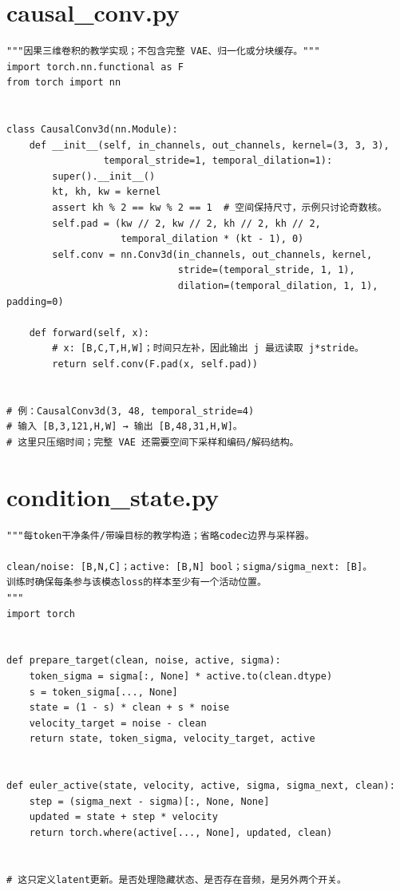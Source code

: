 \section{causal\_conv.py}
\label{code-causal-conv}
\begin{verbatim}
"""因果三维卷积的教学实现；不包含完整 VAE、归一化或分块缓存。"""
import torch.nn.functional as F
from torch import nn


class CausalConv3d(nn.Module):
    def __init__(self, in_channels, out_channels, kernel=(3, 3, 3),
                 temporal_stride=1, temporal_dilation=1):
        super().__init__()
        kt, kh, kw = kernel
        assert kh % 2 == kw % 2 == 1  # 空间保持尺寸，示例只讨论奇数核。
        self.pad = (kw // 2, kw // 2, kh // 2, kh // 2,
                    temporal_dilation * (kt - 1), 0)
        self.conv = nn.Conv3d(in_channels, out_channels, kernel,
                              stride=(temporal_stride, 1, 1),
                              dilation=(temporal_dilation, 1, 1), padding=0)

    def forward(self, x):
        # x: [B,C,T,H,W]；时间只左补，因此输出 j 最远读取 j*stride。
        return self.conv(F.pad(x, self.pad))


# 例：CausalConv3d(3, 48, temporal_stride=4)
# 输入 [B,3,121,H,W] → 输出 [B,48,31,H,W]。
# 这里只压缩时间；完整 VAE 还需要空间下采样和编码/解码结构。
\end{verbatim}

\section{condition\_state.py}
\label{code-condition-state}
\begin{verbatim}
"""每token干净条件/带噪目标的教学构造；省略codec边界与采样器。

clean/noise: [B,N,C]；active: [B,N] bool；sigma/sigma_next: [B]。
训练时确保每条参与该模态loss的样本至少有一个活动位置。
"""
import torch


def prepare_target(clean, noise, active, sigma):
    token_sigma = sigma[:, None] * active.to(clean.dtype)
    s = token_sigma[..., None]
    state = (1 - s) * clean + s * noise
    velocity_target = noise - clean
    return state, token_sigma, velocity_target, active


def euler_active(state, velocity, active, sigma, sigma_next, clean):
    step = (sigma_next - sigma)[:, None, None]
    updated = state + step * velocity
    return torch.where(active[..., None], updated, clean)


# 这只定义latent更新。是否处理隐藏状态、是否存在音频，是另外两个开关。
\end{verbatim}

